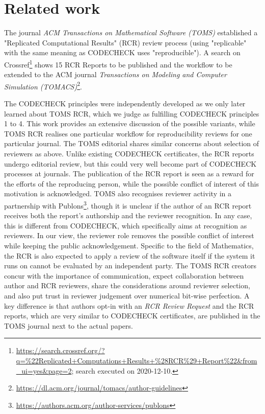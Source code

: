 \documentclass[12pt]{article}
\begin{document}
\section*{Related work}\label{related-work}

The journal \emph{ACM Transactions on Mathematical Software (TOMS)} 
established a "Replicated Computational Results" (RCR) review process
\cite{heroux_editorial_2015} (using "replicable" with the same meaning 
as CODECHECK uses "reproducible").
A search on Crossref\footnote{\url{https://search.crossref.org/?q=\%22Replicated+Computations+Results+\%28RCR\%29+Report\%22&from_ui=yes&page=2}; search executed
on 2020-12-10.} shows 15 RCR Reports to be published and the 
workflow to be 
extended to the ACM journal \emph{Transactions on Modeling and Computer 
Simulation (TOMACS)}\footnote{\url{https://dl.acm.org/journal/tomacs/author-guidelines}}.

The CODECHECK principles were independently developed as we only later 
learned about TOMS RCR, which we judge as fulfilling CODECHECK principles
1 to 4.
This work provides an extensive discussion of the possible variants, 
while TOMS RCR realises one particular workflow for reproducibility 
reviews for one particular journal. The TOMS editorial
\cite{heroux_editorial_2015} shares similar concerns about
selection of reviewers as above. Unlike existing CODECHECK certificates, 
the RCR reports undergo editorial review, but this could very well become
part of CODECHECK processes at journals.
The publication of the RCR report is seen as a reward for the efforts of
the reproducing person, while the possible conflict of interest of this 
motivation is acknowledged. TOMS also recognises reviewer activity in a 
partnership with Publons\footnote{
\url{https://authors.acm.org/author-services/publons}},
though it is unclear if the author of an RCR report receives both the report's
authorship and the reviewer recognition. In any case, this is different
from CODECHECK, which specifically aims at recognition as reviewers.
In our view, the reviewer role removes the possible conflict of interest while
keeping the public acknowledgement.
Specific to the field of Mathematics, the RCR is also expected to apply a
review of the software itself if the system it runs on cannot be evaluated by
an independent party.
The TOMS RCR creators concur with the importance of communication, expect
collaboration between author and RCR reviewers,
share the considerations around reviewer selection, and also put trust
in reviewer judgement over numerical bit-wise perfection.
A key difference is that authors opt-in with an \emph{RCR Review Request} and
the RCR reports, which are very similar to CODECHECK certificates, are
published in the TOMS journal next to the actual papers.
\end{document}
